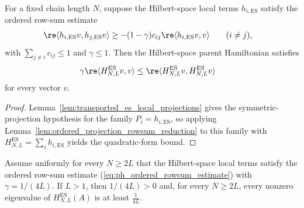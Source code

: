 \begin{lemma}
    \label{lem:parent_hamiltonian_ordered_rowsum_quadratic}
    \leanok
    For a fixed chain length $N$, suppose the Hilbert-space local terms
    $h_{i,\mathrm{ES}}$ satisfy the ordered row-sum estimate
    \begin{align}
        \re\langle h_{i,\mathrm{ES}} v,h_{j,\mathrm{ES}}v\rangle
         & \ge -(1-\gamma)c_{ij}\re\langle h_{i,\mathrm{ES}}v,v\rangle
        \qquad (i\ne j),
        \label{eq:ph_ordered_rowsum_estimate}
    \end{align}
    with $\sum_{j\ne i}c_{ij}\le1$ and $\gamma\le1$. Then the
    Hilbert-space parent Hamiltonian satisfies
    \begin{align}
        \gamma\re\langle H_{N,L}^{\mathrm{ES}}v,v\rangle
         & \le
        \re\langle H_{N,L}^{\mathrm{ES}}v,
        H_{N,L}^{\mathrm{ES}}v\rangle
        \notag
    \end{align}
    for every vector $v$.
\end{lemma}

\begin{proof}
    \leanok
    Lemma~\ref{lem:transported_es_local_projections} gives the symmetric-projection
    hypothesis for the family $P_i=h_{i,\mathrm{ES}}$, so applying
    Lemma~\ref{lem:ordered_projection_rowsum_reduction} to this family with
    $H_{N,L}^{\mathrm{ES}}=\sum_i h_{i,\mathrm{ES}}$ yields the quadratic-form
    bound.
\end{proof}

\begin{lemma}
    \label{lem:parent_hamiltonian_ordered_rowsum_gap}
    \leanok
    Assume uniformly for every $N\ge2L$ that the Hilbert-space local terms
    satisfy the ordered row-sum estimate (\ref{eq:ph_ordered_rowsum_estimate})
    with $\gamma=1/(4L)$. If $L>1$, then $1/(4L)>0$ and, for every
    $N\ge2L$, every nonzero eigenvalue of
    $H_{N,L}^{\mathrm{ES}}(A)$ is at least $\frac{1}{4L}$.
\end{lemma}

